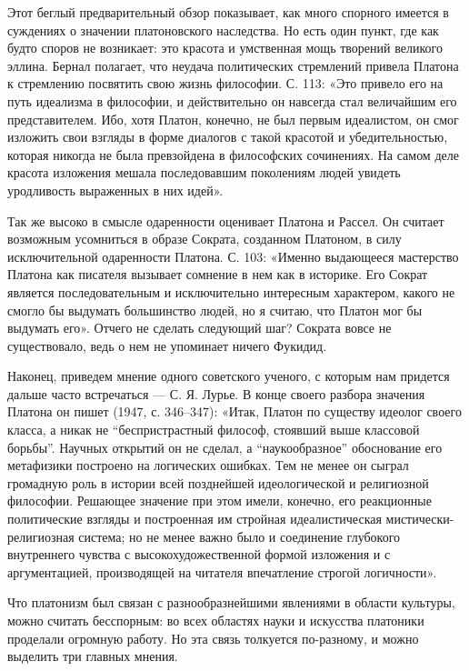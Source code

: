 Этот  беглый  предварительный  обзор показывает,  как  много  спорного
имеется  в  суждениях о  значении  платоновского  наследства. Но  есть
один  пункт,  где  как  будто  споров  не  возникает:  это  красота  и
умственная  мощь  творений  великого   эллина.  Бернал  полагает,  что
неудача политических стремлений привела Платона к стремлению посвятить
свою  жизнь философии.  С. 113:  «Это  привело его  на путь  идеализма
в  философии,   и  действительно  он  навсегда   стал  величайшим  его
представителем. Ибо,  хотя Платон, конечно, не  был первым идеалистом,
он смог  изложить свои  взгляды в  форме диалогов  с такой  красотой и
убедительностью,  которая никогда  не была  превзойдена в  философских
сочинениях.  На  самом  деле красота  изложения  мешала  последовавшим
поколениям людей увидеть уродливость выраженных в них идей».

Так  же высоко  в смысле  одаренности оценивает  Платона и  Рассел. Он
считает возможным  усомниться в образе Сократа,  созданном Платоном, в
силу исключительной  одаренности Платона.  С. 103:  «Именно выдающееся
мастерство  Платона  как  писателя  вызывает  сомнение  в  нем  как  в
историке.  Его   Сократ  является  последовательным   и  исключительно
интересным характером, какого не смогло бы выдумать большинство людей,
но  я считаю,  что  Платон мог  бы выдумать  его».  Отчего не  сделать
следующий шаг? Сократа вовсе не  существовало, ведь о нем не упоминает
ничего Фукидид.

Наконец,  приведем мнение  одного  советского ученого,  с которым  нам
придется  дальше часто  встречаться ---  С. Я.  Лурье. В  конце своего
разбора значения Платона  он пишет (1947, с.  346--347): «Итак, Платон
по  существу  идеолог  своего  класса, а  никак  не  ``беспристрастный
философ,  стоявший выше  классовой  борьбы''. Научных  открытий он  не
сделал, а  ``наукообразное'' обоснование  его метафизики  построено на
логических ошибках.  Тем не менее  он сыграл громадную роль  в истории
всей  позднейшей  идеологической  и  религиозной  философии.  Решающее
значение при этом имели, конечно, его реакционные политические взгляды
и  построенная  им   стройная  идеалистическая  мистически-религиозная
система; но  не менее  важно было  и соединение  глубокого внутреннего
чувства  с высокохудожественной  формой изложения  и с  аргументацией,
производящей на читателя впечатление строгой логичности».

Что  платонизм  был связан  с  разнообразнейшими  явлениями в  области
культуры,  можно   считать  бесспорным:  во  всех   областях  науки  и
искусства платоники проделали огромную  работу. Но эта связь толкуется
по-разному, и можно выделить три главных мнения.

